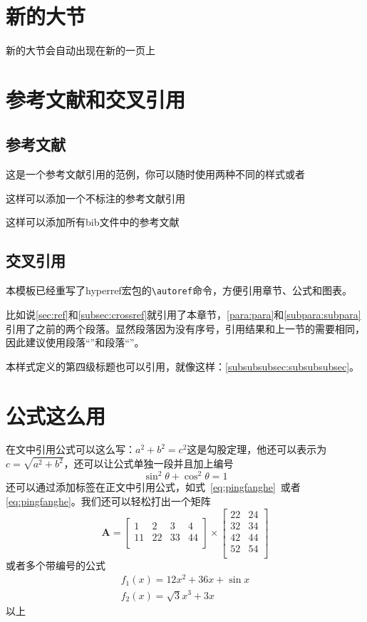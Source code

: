 \documentclass[supercite]{HustGraduPaper}
\begin{document}
	\section{新的大节}
	新的大节会自动出现在新的一页上
	\section{参考文献和交叉引用}\label{sec:ref}
	\subsection{参考文献}
	这是一个参考文献引用的范例\cite{Stone_1998}，你可以随时使用两种不同的样式或者\supercite{Stone_1998}
	
	这样可以添加一个不标注的参考文献引用\nocite{9787508342894}
	
	这样可以添加所有bib文件中的参考文献\nocite{*}
	
	\subsection{交叉引用}\label{subsec:crossref}
	本模板已经重写了hyperref宏包的\verb|\autoref|命令，方便引用章节、公式和图表。
	
	比如说\autoref{sec:ref}和\autoref{subsec:crossref}就引用了本章节，\autoref{para:para}和\autoref{subpara:subpara}引用了之前的两个段落。显然段落因为没有序号，引用结果和上一节的需要相同，因此建议使用段落“”和段落“”。
	
	本样式定义的第四级标题也可以引用，就像这样：\autoref{subsubsubsec:subsubsubsec}。
	
	
	
	\section{公式这么用}
	在文中引用公式可以这么写：$a^2+b^2=c^2$这是勾股定理，他还可以表示为$c=\sqrt{a^2+b^2}$，还可以让公式单独一段并且加上编号
	\begin{equation}
	\sin^2{\theta}+\cos^2{\theta}=1 \label{eq:pingfanghe}
	\end{equation}
	还可以通过添加标签在正文中引用公式，如式~\eqref{eq:pingfanghe}~或者\autoref{eq:pingfanghe}。我们还可以轻松打出一个矩阵
	\begin{equation}
	\bm{A}=\begin{bmatrix}
	1&2&3&4\\
	11&22&33&44\\
	\end{bmatrix}
	\times\begin{bmatrix}
	22&24\\
	32&34\\
	42&44\\
	52&54\\
	\end{bmatrix}
	\end{equation}
	或者多个带编号的公式
	\begin{eqnarray}
	f_1(x)=12x^2+36x+\sin x\\
	f_2(x)=\sqrt{3}{x^3+3x}
	\end{eqnarray}
	以上
	
\end{document}

